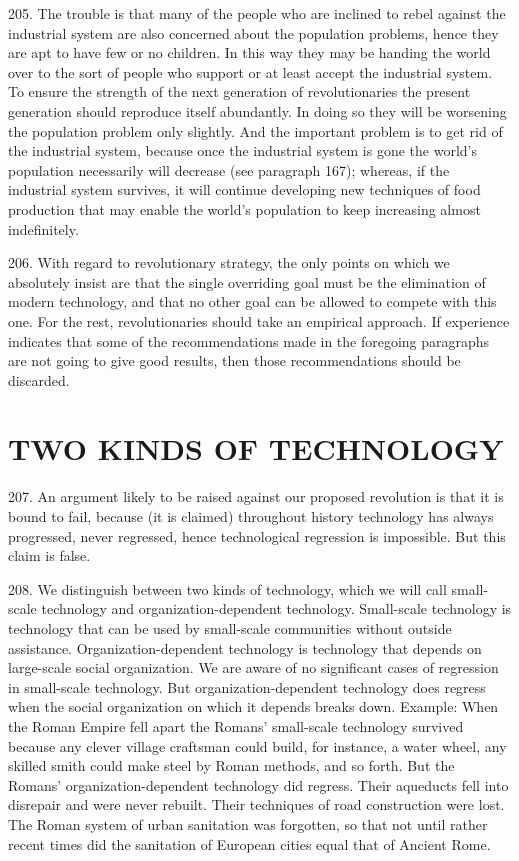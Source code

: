 \documentclass{article}
\begin{document}
205. The trouble is that many of the people who are inclined to rebel against the industrial system 
are also concerned about the population problems, hence they are apt to have few or no children. In 
this way they may be handing the world over to the sort of people who support or at least accept 
the industrial system. To ensure the strength of the next generation of revolutionaries the present 
generation should reproduce itself abundantly. In doing so they will be worsening the population 
problem only slightly. And the important problem is to get rid of the industrial system, because 
once the industrial system is gone the world’s population necessarily will decrease (see paragraph 
167); whereas, if the industrial system survives, it will continue developing new techniques of food 
production that may enable the world’s population to keep increasing almost indefinitely. \vspace{\baselineskip}

206. With regard to revolutionary strategy, the only points on which we absolutely insist are that 
the single overriding goal must be the elimination of modern technology, and that no other goal 
can be allowed to compete with this one. For the rest, revolutionaries should take an empirical 
approach. If experience indicates that some of the recommendations made in the foregoing 
paragraphs are not going to give good results, then those recommendations should be discarded. 


\section{TWO KINDS OF TECHNOLOGY}

\hspace{0.5cm} 207. An argument likely to be raised against our proposed revolution is that it is bound to fail, 
because (it is claimed) throughout history technology has always progressed, never regressed, 
hence technological regression is impossible. But this claim is false. \vspace{\baselineskip}

208. We distinguish between two kinds of technology, which we will call small-scale technology 
and organization-dependent technology. Small-scale technology is technology that can be used 
by small-scale communities without outside assistance. Organization-dependent technology is 
technology that depends on large-scale social organization. We are aware of no significant cases 
of regression in small-scale technology. But organization-dependent technology does regress 
when the social organization on which it depends breaks down. Example: When the Roman 
Empire fell apart the Romans’ small-scale technology survived because any clever village 
craftsman could build, for instance, a water wheel, any skilled smith could make steel by Roman 
methods, and so forth. But the Romans’ organization-dependent technology did regress. Their 
aqueducts fell into disrepair and were never rebuilt. Their techniques of road construction were 
lost. The Roman system of urban sanitation was forgotten, so that not until rather recent times did 
the sanitation of European cities equal that of Ancient Rome. \vspace{\baselineskip}
\end{document}
